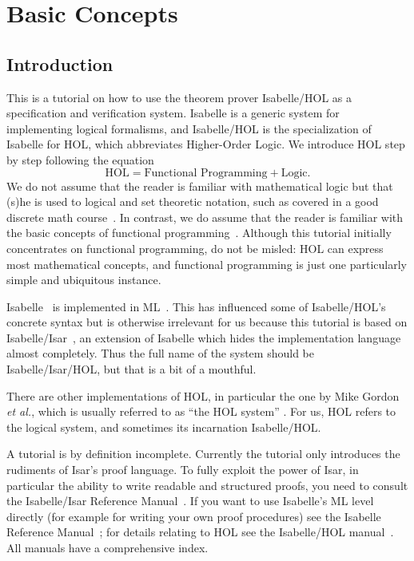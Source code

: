 \chapter{Basic Concepts}

\section{Introduction}

This is a tutorial on how to use the theorem prover Isabelle/HOL as a specification and
verification system. Isabelle is a generic system for implementing logical
formalisms, and Isabelle/HOL is the specialization of Isabelle for
HOL, which abbreviates Higher-Order Logic. We introduce HOL step by step
following the equation
\[ \mbox{HOL} = \mbox{Functional Programming} + \mbox{Logic}. \]
We do not assume that the reader is familiar with mathematical logic but that
(s)he is used to logical and set theoretic notation, such as covered
in a good discrete math course~\cite{Rosen-DMA}. In contrast, we do assume
that the reader is familiar with the basic concepts of functional
programming~\cite{Bird-Haskell,Hudak-Haskell,paulson-ml2,Thompson-Haskell}.
Although this tutorial initially concentrates on functional programming, do
not be misled: HOL can express most mathematical concepts, and functional
programming is just one particularly simple and ubiquitous instance.

Isabelle~\cite{paulson-isa-book} is implemented in ML~\cite{SML}.  This has
influenced some of Isabelle/HOL's concrete syntax but is otherwise irrelevant
for us because this tutorial is based on
Isabelle/Isar~\cite{isabelle-isar-ref}, an extension of Isabelle which hides
the implementation language almost completely.  Thus the full name of the
system should be Isabelle/Isar/HOL, but that is a bit of a mouthful.

There are other implementations of HOL, in particular the one by Mike Gordon
\emph{et al.}, which is usually referred to as ``the HOL system''
\cite{mgordon-hol}. For us, HOL refers to the logical system, and sometimes
its incarnation Isabelle/HOL.

A tutorial is by definition incomplete.  Currently the tutorial only
introduces the rudiments of Isar's proof language. To fully exploit the power
of Isar, in particular the ability to write readable and structured proofs,
you need to consult the Isabelle/Isar Reference
Manual~\cite{isabelle-isar-ref}. If you want to use Isabelle's ML level
directly (for example for writing your own proof procedures) see the Isabelle
Reference Manual~\cite{isabelle-ref}; for details relating to HOL see the
Isabelle/HOL manual~\cite{isabelle-HOL}. All manuals have a comprehensive
index.

